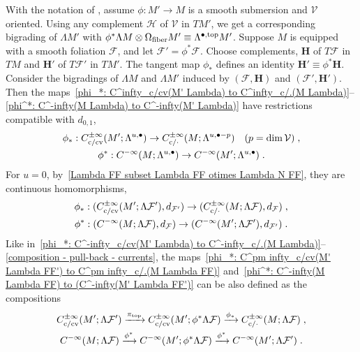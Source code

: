 \documentclass{memo-l}
\theoremstyle{plain}
\theoremstyle{definition}
\theoremstyle{remark}
\newcommand{\FF}{\mathcal{F}}
\newcommand{\HH}{\mathcal{H}}
\newcommand{\VV}{\mathcal{V}}
\newcommand{\bfH}{\boldsymbol{H}}
\newcommand{\fiber}{{\text{\rm fiber}}}
\newcommand{\topd}{{\text{\rm top}}}
\newcommand{\co}{{\text{\rm c}}}
\newcommand{\cv}{{\text{\rm cv}}}
\numberwithin{section}{chapter}
\numberwithin{equation}{section}%
\begin{document}
With the notation of , assume $\phi:M'\to M$ is a  smooth submersion and $\VV$ oriented. Using any complement $\HH$ of $\VV$ in $TM'$, we get a corresponding bigrading of $\Lambda M'$ with $\phi^*\Lambda M\otimes\Omega_\fiber M'\equiv\Lambda^{\bullet,\topd}M'$. Suppose $M$ is equipped with a smooth foliation $\FF$, and let $\FF'=\phi^*\FF$. Choose complements, $\bfH$ of $T\FF$ in $TM$ and $\bfH'$ of $T\FF'$ in $TM'$. The tangent map $\phi_*$ defines an identity $\bfH'\equiv\phi^*\bfH$. Consider the bigradings of $\Lambda M$ and $\Lambda M'$ induced by $(\FF,\bfH)$ and $(\FF',\bfH')$. Then the maps~\eqref{phi_*: C^infty_c/cv(M' Lambda) to C^infty_c/.(M Lambda)}--\eqref{phi^*: C^-infty(M Lambda) to C^-infty(M' Lambda)} have restrictions compatible with $d_{0,1}$,
\begin{gather*}
\phi_*:C^{\pm\infty}_{\co/\cv}(M';\Lambda^{u,\bullet})\to C^{\pm\infty}_{\co/{\cdot}}(M;\Lambda^{u,\bullet-p})\quad(p=\dim\VV)\;,\\
\phi^*:C^{-\infty}(M;\Lambda^{u,\bullet})\to C^{-\infty}(M';\Lambda^{u,\bullet})\;.
\end{gather*}
For $u=0$, by~\eqref{Lambda FF subset Lambda FF otimes Lambda N FF}, they are continuous homomorphisms,
\begin{gather}
\phi_*:(C^{\pm\infty}_{\co/\cv}(M';\Lambda\FF'),d_{\FF'})\to(C^{\pm\infty}_{\co/{\cdot}}(M;\Lambda\FF),d_\FF)\;,
\label{phi_*: C^pm infty_c/cv(M' Lambda FF') to C^pm infty_c/.(M Lambda FF)}\\
\phi^*:(C^{-\infty}(M;\Lambda\FF),d_\FF)\to(C^{-\infty}(M';\Lambda\FF'),d_{\FF'})\;.
\label{phi^*: C^-infty(M Lambda FF) to (C^-infty(M' Lambda FF')}
\end{gather}
Like in~\eqref{phi_*: C^-infty_c/cv(M' Lambda) to C^-infty_c/.(M Lambda)}--\eqref{composition - pull-back - currents}, the maps~\eqref{phi_*: C^pm infty_c/cv(M' Lambda FF') to C^pm infty_c/.(M Lambda FF)} and~\eqref{phi^*: C^-infty(M Lambda FF) to (C^-infty(M' Lambda FF')} can be also defined as the compositions
\begin{gather}
C^{\pm\infty}_{\co/\cv}(M';\Lambda\FF')\xrightarrow{\pi_\topd}C^{\pm\infty}_{\co/\cv}(M';\phi^*\Lambda\FF)
\xrightarrow{\phi_*}C^{\pm\infty}_{\co/{\cdot}}(M;\Lambda\FF)\;,
\label{push-forward - composition - leafwise currents}\\
C^{-\infty}(M;\Lambda\FF)\xrightarrow{\phi^*}C^{-\infty}(M';\phi^*\Lambda \FF)\xrightarrow{\phi^*}C^{-\infty}(M';\Lambda\FF')\;.
\label{pull-back - composition - leafwise currents}
\end{gather}
\end{document}
